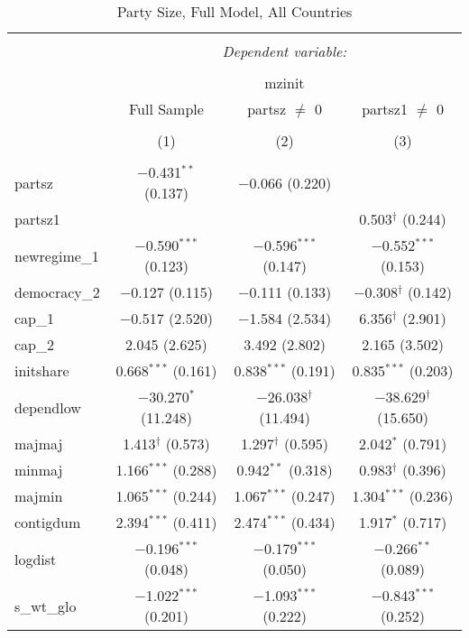 
\begin{table}[!htbp] \centering 
  \caption{Party Size, Full Model, All Countries} 
  \label{} 
\begin{tabular}{@{\extracolsep{5pt}}lccc} 
\\[-1.8ex]\hline 
\hline \\[-1.8ex] 
 & \multicolumn{3}{c}{\textit{Dependent variable:}} \\ 
\cline{2-4} 
\\[-1.8ex] & \multicolumn{3}{c}{mzinit} \\ 
 & Full Sample & partsz $\neq$ 0 & partsz1 $\neq$ 0 \\ 
\\[-1.8ex] & (1) & (2) & (3)\\ 
\hline \\[-1.8ex] 
 partsz & $-$0.431$^{**}$ (0.137) & $-$0.066 (0.220) &  \\ 
  partsz1 &  &  & 0.503$^{\dagger}$ (0.244) \\ 
  newregime\_1 & $-$0.590$^{***}$ (0.123) & $-$0.596$^{***}$ (0.147) & $-$0.552$^{***}$ (0.153) \\ 
  democracy\_2 & $-$0.127 (0.115) & $-$0.111 (0.133) & $-$0.308$^{\dagger}$ (0.142) \\ 
  cap\_1 & $-$0.517 (2.520) & $-$1.584 (2.534) & 6.356$^{\dagger}$ (2.901) \\ 
  cap\_2 & 2.045 (2.625) & 3.492 (2.802) & 2.165 (3.502) \\ 
  initshare & 0.668$^{***}$ (0.161) & 0.838$^{***}$ (0.191) & 0.835$^{***}$ (0.203) \\ 
  dependlow & $-$30.270$^{*}$ (11.248) & $-$26.038$^{\dagger}$ (11.494) & $-$38.629$^{\dagger}$ (15.650) \\ 
  majmaj & 1.413$^{\dagger}$ (0.573) & 1.297$^{\dagger}$ (0.595) & 2.042$^{*}$ (0.791) \\ 
  minmaj & 1.166$^{***}$ (0.288) & 0.942$^{**}$ (0.318) & 0.983$^{\dagger}$ (0.396) \\ 
  majmin & 1.065$^{***}$ (0.244) & 1.067$^{***}$ (0.247) & 1.304$^{***}$ (0.236) \\ 
  contigdum & 2.394$^{***}$ (0.411) & 2.474$^{***}$ (0.434) & 1.917$^{*}$ (0.717) \\ 
  logdist & $-$0.196$^{***}$ (0.048) & $-$0.179$^{***}$ (0.050) & $-$0.266$^{**}$ (0.089) \\ 
  s\_wt\_glo & $-$1.022$^{***}$ (0.201) & $-$1.093$^{***}$ (0.222) & $-$0.843$^{***}$ (0.252) \\ 

\end{tabular}
\end{table}
